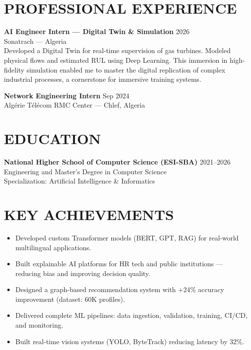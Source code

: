\documentclass[a4paper,12pt]{article}
\begin{document}
\section{PROFESSIONAL EXPERIENCE}
\textbf{AI Engineer Intern — Digital Twin \& Simulation} \hfill 2026 \\
Sonatrach — Algeria \\
Developed a Digital Twin for real-time supervision of gas turbines. Modeled physical flows and estimated RUL using Deep Learning. This immersion in high-fidelity simulation enabled me to master the digital replication of complex industrial processes, a cornerstone for immersive training systems.

\textbf{Network Engineering Intern} \hfill Sep 2024 \\
Algérie Télécom RMC Center — Chlef, Algeria

\section{EDUCATION}
\textbf{National Higher School of Computer Science (ESI-SBA)} \hfill 2021--2026 \\
Engineering and Master’s Degree in Computer Science \\
Specialization: Artificial Intelligence \& Informatics

\section{KEY ACHIEVEMENTS}
\begin{itemize}
    \item Developed custom Transformer models (BERT, GPT, RAG) for real-world multilingual applications.
    \item Built explainable AI platforms for HR tech and public institutions — reducing bias and improving decision quality.
    \item Designed a graph-based recommendation system with +24\% accuracy improvement (dataset: 60K profiles).
    \item Delivered complete ML pipelines: data ingestion, validation, training, CI/CD, and monitoring.
    \item Built real-time vision systems (YOLO, ByteTrack) reducing latency by 32\%.
\end{itemize}

\end{document}
